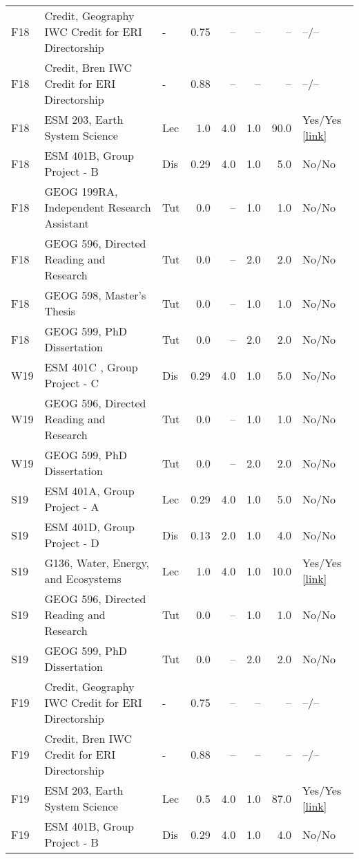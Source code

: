\begin{longtable}{p{1cm}p{7cm}p{0.75cm}rrrrp{2.5cm}}
F18 & Credit, Geography IWC Credit for ERI Directorship & - & 0.75 & -- & -- & -- & --/--    \\ 
F18 & Credit, Bren IWC Credit for ERI Directorship & - & 0.88 & -- & -- & -- & --/--    \\ 
F18 & ESM 203, Earth System Science & Lec & 1.0 & 4.0 & 1.0 & 90.0 & Yes/Yes  \href{https://ucsb.box.com/s/vvhpxerul6hbzum3fvmwigzd3y8yset6}{[link]}  \\ 
F18 & ESM 401B, Group Project - B & Dis & 0.29 & 4.0 & 1.0 & 5.0 & No/No    \\ 
F18 & GEOG 199RA, Independent Research Assistant & Tut & 0.0 & -- & 1.0 & 1.0 & No/No    \\ 
F18 & GEOG 596, Directed Reading and Research & Tut & 0.0 & -- & 2.0 & 2.0 & No/No    \\ 
F18 & GEOG 598, Master’s Thesis & Tut & 0.0 & -- & 1.0 & 1.0 & No/No    \\ 
F18 & GEOG 599, PhD Dissertation & Tut & 0.0 & -- & 2.0 & 2.0 & No/No    \\ 
W19 & ESM 401C , Group Project - C & Dis & 0.29 & 4.0 & 1.0 & 5.0 & No/No    \\ 
W19 & GEOG 596, Directed Reading and Research & Tut & 0.0 & -- & 1.0 & 1.0 & No/No    \\ 
W19 & GEOG 599, PhD Dissertation & Tut & 0.0 & -- & 2.0 & 2.0 & No/No    \\ 
S19 & ESM 401A, Group Project - A & Lec & 0.29 & 4.0 & 1.0 & 5.0 & No/No    \\ 
S19 & ESM 401D, Group Project - D & Dis & 0.13 & 2.0 & 1.0 & 4.0 & No/No    \\ 
S19 & G136, Water, Energy, and Ecosystems & Lec & 1.0 & 4.0 & 1.0 & 10.0 & Yes/Yes  \href{https://ucsb.box.com/s/9oj1uqebr0a3gcg9brhfxw6ys8atw9oi}{[link]}  \\ 
S19 & GEOG 596, Directed Reading and Research & Tut & 0.0 & -- & 1.0 & 1.0 & No/No    \\ 
S19 & GEOG 599, PhD Dissertation & Tut & 0.0 & -- & 2.0 & 2.0 & No/No    \\ 
F19 & Credit, Geography IWC Credit for ERI Directorship & - & 0.75 & -- & -- & -- & --/--    \\ 
F19 & Credit, Bren IWC Credit for ERI Directorship & - & 0.88 & -- & -- & -- & --/--    \\ 
F19 & ESM 203, Earth System Science & Lec & 0.5 & 4.0 & 1.0 & 87.0 & Yes/Yes  \href{https://ucsb.box.com/s/btln348spk7zsculb0swyrqe6nt0so33}{[link]}  \\ 
F19 & ESM 401B, Group Project - B & Dis & 0.29 & 4.0 & 1.0 & 4.0 & No/No    \\ 

\end{longtable}
